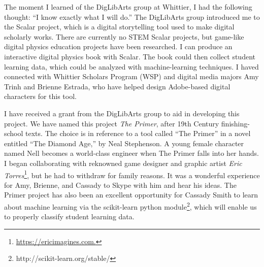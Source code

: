\documentclass[../../main.tex]{subfiles}
\begin{document}
The moment I learned of the DigLibArts group at Whittier, I had the following thought: ``I know exactly what I will do.''  The DigLibArts group introduced me to the Scalar project, which is a digital storytelling tool used to make digital scholarly works.  There are currently no STEM Scalar projects, but game-like digital physics education projects have been researched\cite{orban2017a}.  I can produce an interactive digital physics book with Scalar.  The book could then collect student learning data, which could be analyzed with machine-learning techniques.  I haved connected with Whittier Scholars Program (WSP) and digital media majors Amy Trinh and Brienne Estrada, who have helped design Adobe-based digital characters for this tool. \\ \hspace{0.1cm}

I have received a grant from the DigLibArts group to aid in developing this project.  We have named this project \textit{The Primer}, after 19th Century finishing-school texts.  The choice is in reference to a tool called ``The Primer'' in a novel entitled ``The Diamond Age,'' by Neal Stephenson.  A young female character named Nell becomes a world-class engineer when The Primer falls into her hands.  I began collaborating with reknowned game designer and graphic artist \textit{Eric Torres}\footnote{\url{https://ericimagines.com.}}, but he  had to withdraw for family reasons.  It was a wonderful experience for Amy, Brienne, and Cassady to Skype with him and hear his ideas. The Primer project has also been an excellent opportunity for Cassady Smith to learn about machine learning via the scikit-learn python module\footnote{http://scikit-learn.org/stable/}, which will enable us to properly classify student learning data.
\end{document}
